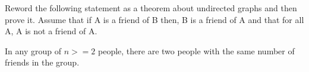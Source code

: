 Reword the following statement as a theorem about undirected graphs
and then prove it. Assume that if A is a friend of B then, B is a
friend of A and that for all A, A is not a friend of A.

In any group of $n >= 2$ people, there are two people with the same
number of friends in the group.



